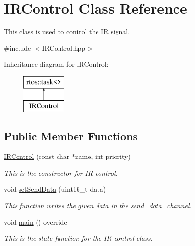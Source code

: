 \hypertarget{class_i_r_control}{}\section{I\+R\+Control Class Reference}
\label{class_i_r_control}


This class is used to control the IR signal.  




{\ttfamily \#include $<$I\+R\+Control.\+hpp$>$}

Inheritance diagram for I\+R\+Control\+:\begin{figure}[H]
\begin{center}
\leavevmode
\includegraphics[height=2.000000cm]{class_i_r_control}
\end{center}
\end{figure}
\subsection*{Public Member Functions}
\begin{DoxyCompactItemize}
\item 
\mbox{\label{class_i_r_control_a8215b1ea3c124039e11422b597f31b95}} 
\mbox{\hyperlink{class_i_r_control_a8215b1ea3c124039e11422b597f31b95}{I\+R\+Control}} (const char $\ast$name, int priority)
\begin{DoxyCompactList}\small\item\em This is the constructor for IR control. \end{DoxyCompactList}\item 
\mbox{\label{class_i_r_control_aeb6e04f6fb5260ed9d8b6b33eac42c37}} 
void \mbox{\hyperlink{class_i_r_control_aeb6e04f6fb5260ed9d8b6b33eac42c37}{set\+Send\+Data}} (uint16\+\_\+t data)
\begin{DoxyCompactList}\small\item\em This function writes the given data in the send\+\_\+data\+\_\+channel. \end{DoxyCompactList}\item 
void \mbox{\hyperlink{class_i_r_control_a015c547c9a8a37bc99fc3f98190b6787}{main}} () override
\begin{DoxyCompactList}\small\item\em This is the state function for the IR control class. \end{DoxyCompactList}\end{DoxyCompactItemize}


